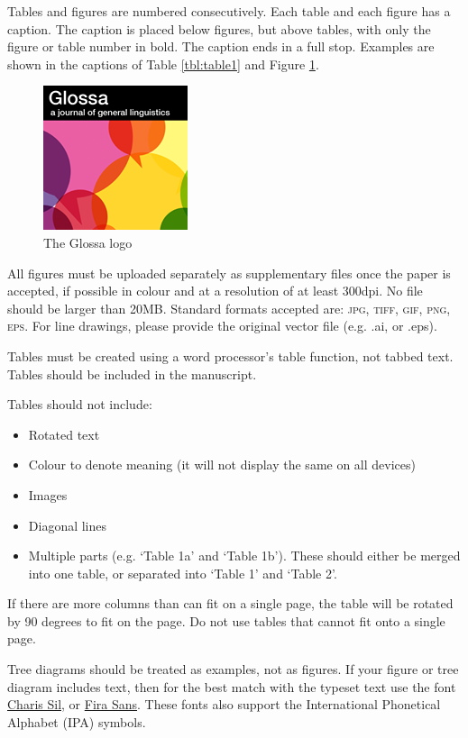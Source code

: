 \documentclass[charis,linguex]{glossa}
\begin{document}
Tables and figures are numbered consecutively. Each table and each figure has a caption. The caption is placed below figures, but above tables, with only the figure or table number in bold. The caption ends in a full stop. Examples are shown in the captions of Table \ref{tbl:table1} and Figure \ref{fig:glossalogo}. 

\begin{figure}[h]
\centering
\includegraphics{glossa}
\caption{The Glossa logo}
\label{fig:glossalogo}
\end{figure}

All figures must be uploaded separately as supplementary files once the paper is accepted, if possible in colour and at a resolution of at least 300dpi. No file should be larger than 20MB. Standard formats accepted are: \textsc{jpg, tiff, gif, png, eps}. For line drawings, please provide the original vector file (e.g. .ai, or .eps).

Tables must be created using a word processor's table function, not tabbed text. Tables should be included in the manuscript. 

Tables should not include:

\begin{itemize}
\item Rotated text
\item Colour to denote meaning (it will not display the same on all devices)
\item Images
\item Diagonal lines
\item Multiple parts (e.g. `Table 1a' and `Table 1b'). These should either be merged into one table, or separated into `Table 1' and `Table 2'.
\end{itemize}
If there are more columns than can fit on a single page, the table will be rotated by 90 degrees to fit on the page. Do not use tables that cannot fit onto a single page.

Tree diagrams should be treated as examples, not as figures. If your figure or tree diagram includes text, then for the best match with the typeset text use the font \href{https://software.sil.org/charis/download/}{Charis Sil}, or \href{https://www.fontsquirrel.com/fonts/fira-sans}{Fira Sans}. These fonts also support the International Phonetical Alphabet (IPA) symbols.
\end{document}
